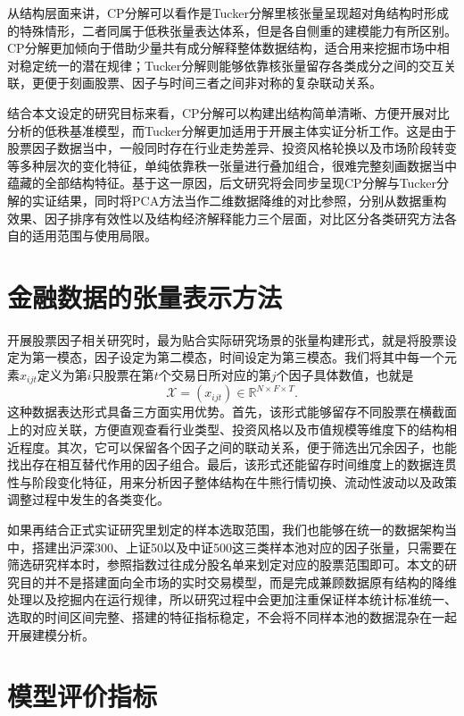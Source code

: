 从结构层面来讲，CP分解可以看作是Tucker分解里核张量呈现超对角结构时形成的特殊情形，二者同属于低秩张量表达体系，但是各自侧重的建模能力有所区别。CP分解更加倾向于借助少量共有成分解释整体数据结构，适合用来挖掘市场中相对稳定统一的潜在规律；Tucker分解则能够依靠核张量留存各类成分之间的交互关联，更便于刻画股票、因子与时间三者之间非对称的复杂联动关系。

结合本文设定的研究目标来看，CP分解可以构建出结构简单清晰、方便开展对比分析的低秩基准模型，而Tucker分解更加适用于开展主体实证分析工作。这是由于股票因子数据当中，一般同时存在行业走势差异、投资风格轮换以及市场阶段转变等多种层次的变化特征，单纯依靠秩一张量进行叠加组合，很难完整刻画数据当中蕴藏的全部结构特征。基于这一原因，后文研究将会同步呈现CP分解与Tucker分解的实证结果，同时将PCA方法当作二维数据降维的对比参照，分别从数据重构效果、因子排序有效性以及结构经济解释能力三个层面，对比区分各类研究方法各自的适用范围与使用局限。

\section{金融数据的张量表示方法}

开展股票因子相关研究时，最为贴合实际研究场景的张量构建形式，就是将股票设定为第一模态，因子设定为第二模态，时间设定为第三模态。我们将其中每一个元素$x_{ijt}$定义为第$i$只股票在第$t$个交易日所对应的第$j$个因子具体数值，也就是
\begin{equation}
\mathcal{X}=(x_{ijt})\in\mathbb{R}^{N\times F\times T}.
\end{equation}
这种数据表达形式具备三方面实用优势。首先，该形式能够留存不同股票在横截面上的对应关联，方便直观查看行业类型、投资风格以及市值规模等维度下的结构相近程度。其次，它可以保留各个因子之间的联动关系，便于筛选出冗余因子，也能找出存在相互替代作用的因子组合。最后，该形式还能留存时间维度上的数据连贯性与阶段变化特征，用来分析因子整体结构在牛熊行情切换、流动性波动以及政策调整过程中发生的各类变化。

如果再结合正式实证研究里划定的样本选取范围，我们也能够在统一的数据架构当中，搭建出沪深300、上证50以及中证500这三类样本池对应的因子张量，只需要在筛选研究样本时，参照指数过往成分股名单来划定对应的股票范围即可。本文的研究目的并不是搭建面向全市场的实时交易模型，而是完成兼顾数据原有结构的降维处理以及挖掘内在运行规律，所以研究过程中会更加注重保证样本统计标准统一、选取的时间区间完整、搭建的特征指标稳定，不会将不同样本池的数据混杂在一起开展建模分析。

\section{模型评价指标}

